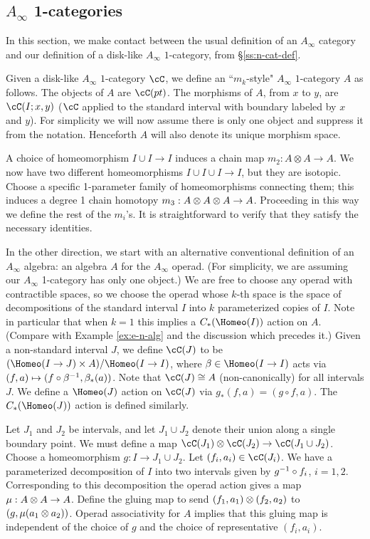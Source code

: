 \subsection{\texorpdfstring{$A_\infty$}{A-infinity} 1-categories}
\label{sec:comparing-A-infty}
In this section, we make contact between the usual definition of an $A_\infty$ category 
and our definition of a disk-like $A_\infty$ $1$-category, from \S \ref{ss:n-cat-def}.

\medskip

Given a disk-like $A_\infty$ $1$-category $\cC$, we define an ``$m_k$-style" 
$A_\infty$ $1$-category $A$ as follows.
The objects of $A$ are $\cC(pt)$.
The morphisms of $A$, from $x$ to $y$, are $\cC(I; x, y)$
($\cC$ applied to the standard interval with boundary labeled by $x$ and $y$).
For simplicity we will now assume there is only one object and suppress it from the notation.
Henceforth $A$ will also denote its unique morphism space.

A choice of homeomorphism $I\cup I \to I$ induces a chain map $m_2: A\otimes A\to A$.
We now have two different homeomorphisms $I\cup I\cup I \to I$, but they are isotopic.
Choose a specific 1-parameter family of homeomorphisms connecting them; this induces
a degree 1 chain homotopy $m_3:A\otimes A\otimes A\to A$.
Proceeding in this way we define the rest of the $m_i$'s.
It is straightforward to verify that they satisfy the necessary identities.

\medskip

In the other direction, we start with an alternative conventional definition of an $A_\infty$ algebra:
an algebra $A$ for the $A_\infty$ operad.
(For simplicity, we are assuming our $A_\infty$ 1-category has only one object.)
We are free to choose any operad with contractible spaces, so we choose the operad
whose $k$-th space is the space of decompositions of the standard interval $I$ into $k$
parameterized copies of $I$.
Note in particular that when $k=1$ this implies a $C_*(\Homeo(I))$ action on $A$.
(Compare with Example \ref{ex:e-n-alg} and the discussion which precedes it.)
Given a non-standard interval $J$, we define $\cC(J)$ to be
$(\Homeo(I\to J) \times A)/\Homeo(I\to I)$,
where $\beta \in \Homeo(I\to I)$ acts via $(f, a) \mapsto (f\circ \beta^{-1}, \beta_*(a))$.
Note that $\cC(J) \cong A$ (non-canonically) for all intervals $J$.
We define a $\Homeo(J)$ action on $\cC(J)$ via $g_*(f, a) = (g\circ f, a)$.
The $C_*(\Homeo(J))$ action is defined similarly.

Let $J_1$ and $J_2$ be intervals, and let $J_1\cup J_2$ denote their union along a single boundary point.
We must define a map $\cC(J_1)\ot\cC(J_2)\to\cC(J_1\cup J_2)$.
Choose a homeomorphism $g:I\to J_1\cup J_2$.
Let $(f_i, a_i)\in \cC(J_i)$.
We have a parameterized decomposition of $I$ into two intervals given by
$g^{-1} \circ f_i$, $i=1,2$.
Corresponding to this decomposition the operad action gives a map $\mu: A\otimes A\to A$.
Define the gluing map to send $(f_1, a_1)\otimes (f_2, a_2)$ to $(g, \mu(a_1\otimes a_2))$.
Operad associativity for $A$ implies that this gluing map is independent of the choice of
$g$ and the choice of representative $(f_i, a_i)$.


